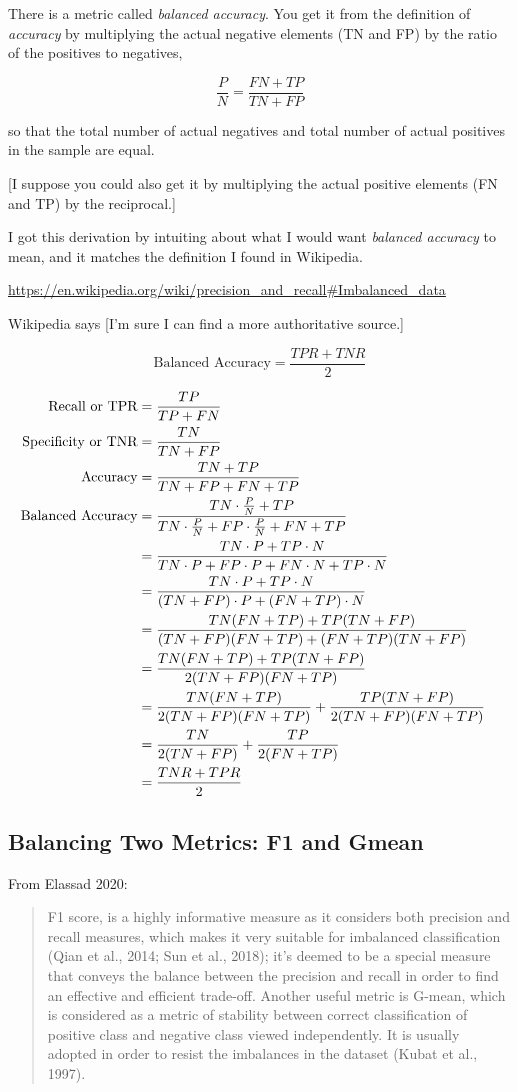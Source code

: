 There is a metric called {\it balanced accuracy}.  You get it from the definition of {\it accuracy} by multiplying the actual negative elements (TN and FP) by the ratio of the positives to negatives, 

$$\frac{P}{N} = \frac{FN+TP}{TN+FP}$$

so that the total number of actual negatives and total number of actual positives in the sample are equal.

[I suppose you could also get it by multiplying the actual positive elements (FN and TP) by the reciprocal.]

I got this derivation by intuiting about what I would want {\it balanced accuracy} to mean, and it matches the definition I found in Wikipedia.  

\url{https://en.wikipedia.org/wiki/precision_and_recall#Imbalanced_data}

Wikipedia says [I'm sure I can find a more authoritative source.]

$$\text{Balanced Accuracy} = \frac{TPR + TNR}{2}$$

\begin{align*}
	\text{Recall or TPR} &= \frac{TP}{TP+FN} \cr
	\text{Specificity or TNR} &= \frac{TN}{TN+FP} \cr
	\text{Accuracy} &= \frac{TN+TP}{TN+FP+FN+TP} \cr
	\text{Balanced Accuracy} &=  \frac{TN \cdot \frac{P}{N}+TP}{TN \cdot \frac{P}{N}+FP \cdot \frac{P}{N}+FN+TP} \cr
		&= \frac{TN \cdot P+TP \cdot N}{TN \cdot P+FP \cdot P+FN \cdot N+TP\cdot N} \cr
	&= \frac{TN \cdot P+TP \cdot N}{(TN+FP) \cdot P+(FN+TP) \cdot  N} \cr
	&= \frac{TN (FN+TP)+TP (TN+FP)}{(TN+FP) (FN+TP)+(FN+TP) (TN+FP)} \cr
	&= \frac{TN (FN+TP)+TP (TN+FP)}{2(TN+FP) (FN+TP)} \cr
	&= \frac{TN (FN+TP)}{2(TN+FP) (FN+TP)}  + \frac{TP (TN+FP)}{2(TN+FP) (FN+TP)} \cr
	&= \frac{TN}{2(TN+FP) }  + \frac{TP }{2 (FN+TP)} \cr
	&= \frac{TNR+TPR}{2} \cr
\end{align*}


\subsection{Balancing Two Metrics:  F1 and Gmean}

From Elassad 2020:
\cite{ELAMRANIABOUELASSAD2020102708}

\begin{quote}
F1 score, is a highly informative measure as it considers both precision and recall measures, which makes it very suitable for
imbalanced classification (Qian et al., 2014; Sun et al., 2018); it’s deemed to be a special measure that conveys the balance between
the precision and recall in order to find an effective and efficient trade-off. Another useful metric is G-mean, which is considered as a
metric of stability between correct classification of positive class and negative class viewed independently. It is usually adopted in
order to resist the imbalances in the dataset (Kubat et al., 1997).
\end{quote}


